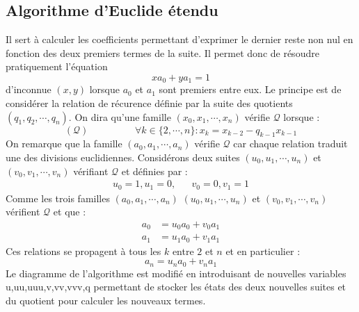 \subsection{Algorithme d'Euclide étendu}
Il sert à calculer les coefficients permettant d'exprimer le dernier reste non nul en fonction des deux premiers termes de la suite. Il permet donc de résoudre pratiquement l'équation
\begin{displaymath}
 xa_0 + ya_1 =1
\end{displaymath}
 d'inconnue $(x,y)$ lorsque $a_0$ et $a_1$ sont premiers entre eux.\newline
Le principe est de considérer la relation de récurence définie par la suite des quotients $(q_1,q_2,\cdots,q_n)$. On dira qu'une famille $(x_0,x_1,\cdots,x_n)$ vérifie $\mathcal Q$ lorsque :
\begin{displaymath}
 (\mathcal Q)\hspace{2cm} \forall k\in\{2,\cdots,n\} : x_k = x_{k-2}-q_{k-1}x_{k-1}
\end{displaymath}
On remarque que la famille $(a_0,a_1,\cdots,a_n)$ vérifie $\mathcal Q$ car chaque relation traduit une des divisions euclidiennes. Considérons deux suites $(u_0,u_1,\cdots,u_n)$ et $(v_0,v_1,\cdots,v_n)$ vérifiant $\mathcal Q$ et définies par :
\begin{align*}
 u_0=1, u_1=0,  & & v_0=0, v_1=1
\end{align*}
Comme les trois familles $(a_0,a_1,\cdots,a_n)$ $(u_0,u_1,\cdots,u_n)$ et $(v_0,v_1,\cdots,v_n)$ vérifient $\mathcal Q$ et que :
\begin{align*}
 a_0 &= u_0a_0 + v_0a_1 \\
 a_1 &= u_1a_0 + v_1a_1
\end{align*}
Ces relations se propagent à tous les $k$ entre $2$ et $n$ et en particulier :
\begin{displaymath}
 a_n = u_na_0 + v_na_1
\end{displaymath}
Le diagramme de l'algorithme est modifié en introduisant de nouvelles variables u,uu,uuu,v,vv,vvv,q permettant de stocker les états des deux nouvelles suites et du quotient pour calculer les nouveaux termes.
